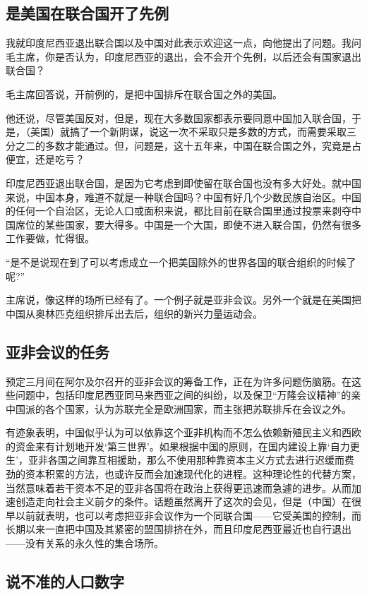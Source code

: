 \subsection{是美国在联合国开了先例}

我就印度尼西亚退出联合国以及中国对此表示欢迎这一点，向他提出了问题。我问毛主席，你是否认为，印度尼西亚的退出，会不会开个先例，以后还会有国家退出联合国？

毛主席回答说，开前例的，是把中国排斥在联合国之外的美国。

他还说，尽管美国反对，但是，现在大多数国家都表示要同意中国加入联合国，于是，（美国）就搞了一个新阴谋，说这一次不采取只是多数的方式，而需要采取三分之二的多数才能通过。但，问题是，这十五年来，中国在联合国之外，究竟是占便宜，还是吃亏？

印度尼西亚退出联合国，是因为它考虑到即使留在联合国也没有多大好处。就中国来说，中国本身，难道不就是一种联合国吗？中国有好几个少数民族自治区。中国的任何一个自治区，无论人口或面积来说，都比目前在联合国里通过投票来剥夺中国席位的某些国家，要大得多。中国是一个大国，即使不进入联合国，仍然有很多工作要做，忙得很。

“是不是说现在到了可以考虑成立一个把美国除外的世界各国的联合组织的时候了呢?”

主席说，像这样的场所已经有了。一个例子就是亚非会议。另外一个就是在美国把中国从奥林匹克组织排斥出去后，组织的新兴力量运动会。

\subsection{亚非会议的任务}

预定三月间在阿尔及尔召开的亚非会议的筹备工作，正在为许多问题伤脑筋。在这些问题中，包括印度尼西亚同马来西亚之间的纠纷，以及保卫“万隆会议精神”的亲中国派的各个国家，认为苏联完全是欧洲国家，而主张把苏联排斥在会议之外。

有迹象表明，中国似乎认为可以依靠这个亚非机构而不怎么依赖新殖民主义和西欧的资金来有计划地开发‘第三世界’。如果根据中国的原则，在国内建设上靠‘自力更生’，亚非各国之间靠互相援助，那么不使用那种靠资本主义方式去进行迟缓而费劲的资本积累的方法，也或许反而会加速现代化的进程。这种理论性的代替方案，当然意味着若干资本不足的亚非各国将在政治上获得更迅速而急遽的进步。从而加速创造走向社会主义前夕的条件。话题虽然离开了这次的会见，但是（中国）在很早以前就表明，也可以考虑把亚非会议作为一个同联合国——它受美国的控制，而长期以来一直把中国及其紧密的盟国排挤在外，而且印度尼西亚最近也自行退出——没有关系的永久性的集合场所。

\subsection{说不准的人口数字}

